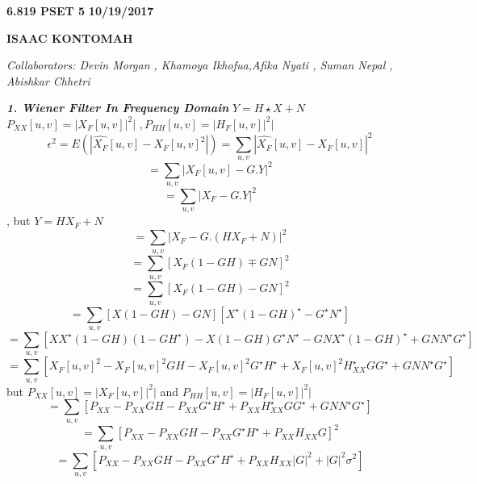 \documentclass[a4paper,12pt]{article}
\begin{document}
\begin{flushleft}\newline \textbf{6.819 PSET 5}
\newline \textbf{10/19/2017}
\end{flushleft}
\newline \begin{center}\textbf{ISAAC KONTOMAH}
\end{center}
\begin{flushleft}
\newline \emph{Collaborators: Devin Morgan , Khamoya Ikhofua,Afika Nyati , Suman Nepal , Abishkar Chhetri}
\end{flushleft}

\newline \emph{\textbf{1. Wiener Filter In Frequency Domain}}
\newline $Y=H \star X + N $
\newline $P_{XX}[u,v]=|X_{F}[u,v]|^{2}|$
$,P_{HH}[u,v]=|H_{F}[u,v]|^{2}|$
\newline $$\epsilon^{2}=E(| \hat{X_{F}}[u,v]-X_{F}[u,v]^{2} |)=\sum_{u,v}|\hat{X_{F}}[u,v]-{X_{F}}[u,v]|^{2}$$
\newline $$=\sum_{u,v}|X_{F}[u,v]-G.Y|^{2} $$
\newline $$=\sum_{u,v}|X_{F}-G.Y|^{2} $$ , but $Y=HX_{F}+N$
\newline $$=\sum_{u,v}|X_{F}-G.(HX_{F}+N)|^{2} $$ 
\newline $$=\sum_{u,v}[X_{F}(1-GH) \mp GN]^{2} $$ 
\newline $$=\sum_{u,v}[X_{F}(1-GH) - GN]^{2} $$ 
\newline $$=\sum_{u,v}[X(1-GH) - GN][X^{\star}(1-GH)^{\star}-G^{\star}N^{\star}]$$ 
\newline $$=\sum_{u,v}[XX^{\star}(1-GH)(1-GH^{\star}) - X(1-GH)G^{\star}N^{\star}-GNX^{\star}(1-GH)^{\star}+GNN^{\star}G^{\star}]$$ 
\newline $$=\sum_{u,v}[X_{F}[u,v]^{2}-X_{F}[u,v]^{2}GH-X_{F}[u,v]^{2}G^{\star}H^{\star}+X_{F}[u,v]^{2}H_{XX}^{\star}GG^{\star}+GNN^{\star}G^{\star}]$$ 
\newline but $P_{XX}[u,v]=|X_{F}[u,v]|^{2}|$ and $P_{HH}[u,v]=|H_{F}[u,v]|^{2}|$
$$=\sum_{u,v}[P_{XX}-P_{XX}GH-P_{XX}G^{\star}H^{\star}+P_{XX}H_{XX}^{\star}GG^{\star}+GNN^{\star}G^{\star}]$$ 
\newline $$=\sum_{u,v}[P_{XX}-P_{XX}GH-P_{XX}G^{\star}H^{\star}+P_{XX}H_{XX}G]^{2}$$ 
\newline $$=\sum_{u,v}[P_{XX}-P_{XX}GH-P_{XX}G^{\star}H^{\star}+P_{XX}H_{XX}|G|^{2}+|G|^{2}\sigma^{2}]$$ 
\end{document}
